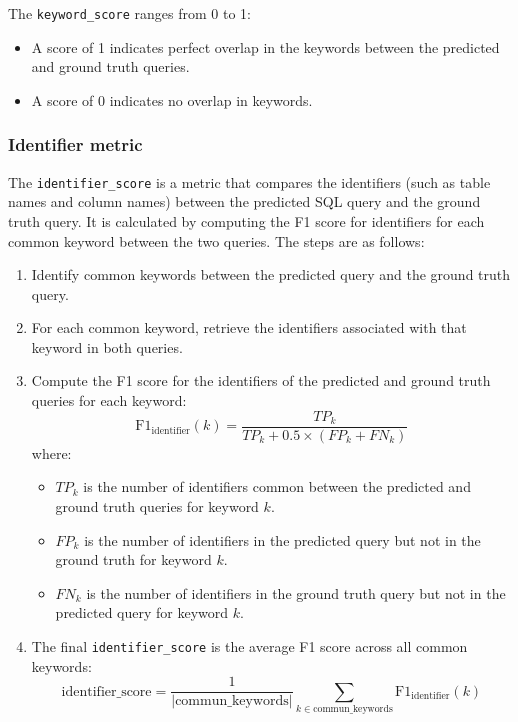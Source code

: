 \documentclass[12pt,a4paper]{article}
\begin{document}
The \texttt{keyword\_score} ranges from 0 to 1:
\begin{itemize}
  \item A score of 1 indicates perfect overlap in the keywords between the predicted and ground truth queries.
  \item A score of 0 indicates no overlap in keywords.
\end{itemize}

\subsubsection*{Identifier metric}

The \texttt{identifier\_score} is a metric that compares the identifiers (such as table names and column names) between the predicted SQL query and the ground truth query. It is calculated by computing the F1 score for identifiers for each common keyword between the two queries. The steps are as follows:

\begin{enumerate}
    \item Identify common keywords between the predicted query and the ground truth query.
    \item For each common keyword, retrieve the identifiers associated with that keyword in both queries.
    \item Compute the F1 score for the identifiers of the predicted and ground truth queries for each keyword:
    \[
    \text{F1}_{\text{identifier}}(k) = \frac{TP_k}{TP_k + 0.5 \times (FP_k + FN_k)}
    \]
    where:
    \begin{itemize}
        \item \( TP_k \) is the number of identifiers common between the predicted and ground truth queries for keyword \( k \).
        \item \( FP_k \) is the number of identifiers in the predicted query but not in the ground truth for keyword \( k \).
        \item \( FN_k \) is the number of identifiers in the ground truth query but not in the predicted query for keyword \( k \).
    \end{itemize}
    \item The final \texttt{identifier\_score} is the average F1 score across all common keywords:
    \[
    \text{identifier\_score} = \frac{1}{|\text{commun\_keywords}|} \sum_{k \in \text{commun\_keywords}} \text{F1}_{\text{identifier}}(k)
    \]
\end{enumerate}
\end{document}
